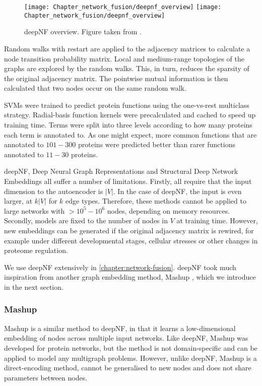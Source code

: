 \begin{figure}[!hbt]
    \centering
    \ifredact
        \texttt{[image: Chapter\_network\_fusion/deepnf\_overview]}
    \else
        \texttt{[image: Chapter\_network\_fusion/deepnf\_overview]}
    \fi
    \caption{%
        deepNF overview.
        Figure taken from \cite{Gligorijevic2018}.
    }
    \label{fig:deepNF}
\end{figure}

Random walks with restart are applied to the adjacency matrices to calculate a node transition probability matrix. Local and medium-range topologies of the graphs are explored by the random walks. This, in turn, reduces the sparsity of the original adjacency matrix. The pointwise mutual information is then calculated that two nodes occur on the same random walk.

SVMs were trained to predict protein functions using the one-vs-rest multiclass strategy. Radial-basis function kernels were precalculated and cached to speed up training time. Terms were split into three levels according to how many proteins each term is annotated to. As one might expect, more common functions that are annotated to $101-300$ proteins were predicted better than rarer functions annotated to $11-30$ proteins.

deepNF, Deep Neural Graph Representations and Structural Deep Network Embeddings all suffer a number of limitations. Firstly, all require that the input dimension to the autoencoder is $|V|$. In the case of deepNF, the input is even larger, at $k|V|$ for $k$ edge types. Therefore, these methods cannot be applied to large networks with $> 10^5 - 10^6$ nodes, depending on memory resources. Secondly, models are fixed to the number of nodes in $V$ at training time. However, new embeddings can be generated if the original adjacency matrix is rewired, for example under different developmental stages, cellular stresses or other changes in proteome regulation.

We use deepNF extensively in \ref{chapter:network-fusion}. deepNF took much inspiration from another graph embedding method, Mashup \cite{Cho2016}, which we introduce in the next section.

\subsubsection{Mashup}

Mashup \cite{Cho2016} is a similar method to deepNF, in that it learns a low-dimensional embedding of nodes across multiple input networks. Like deepNF, Mashup was developed for protein networks, but the method is not domain-specific and can be applied to model any multigraph problems. However, unlike deepNF, Mashup is a direct-encoding method, cannot be generalised to new nodes and does not share parameters between nodes.

